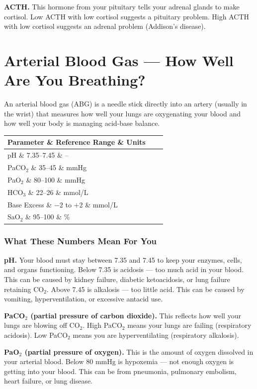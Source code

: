 \textbf{ACTH.} This hormone from your pituitary tells your adrenal glands to make cortisol. Low ACTH with low cortisol suggests a pituitary problem. High ACTH with low cortisol suggests an adrenal problem (Addison's disease).

\clearpage
\section{Arterial Blood Gas --- How Well Are You Breathing?}

An arterial blood gas (ABG) is a needle stick directly into an artery (usually in the wrist) that measures how well your lungs are oxygenating your blood and how well your body is managing acid-base balance.

\begin{longtable}{@{}lll@{}}
\toprule
\textbf{Parameter} \& \textbf{Reference Range} \& \textbf{Units} \\
\midrule
pH \& 7.35--7.45 \& -- \\
PaCO$_2$ \& 35--45 \& mmHg \\
PaO$_2$ \& 80--100 \& mmHg \\
HCO$_3$ \& 22--26 \& mmol/L \\
Base Excess \& $-2$ to $+2$ \& mmol/L \\
SaO$_2$ \& 95--100 \& \% \\
\bottomrule
\end{longtable}

\subsubsection{What These Numbers Mean For You}

\textbf{pH.} Your blood must stay between 7.35 and 7.45 to keep your enzymes, cells, and organs functioning. Below 7.35 is acidosis --- too much acid in your blood. This can be caused by kidney failure, diabetic ketoacidosis, or lung failure retaining CO$_2$. Above 7.45 is alkalosis --- too little acid. This can be caused by vomiting, hyperventilation, or excessive antacid use.

\textbf{PaCO$_2$ (partial pressure of carbon dioxide).} This reflects how well your lungs are blowing off CO$_2$. High PaCO$_2$ means your lungs are failing (respiratory acidosis). Low PaCO$_2$ means you are hyperventilating (respiratory alkalosis).

\textbf{PaO$_2$ (partial pressure of oxygen).} This is the amount of oxygen dissolved in your arterial blood. Below 80 mmHg is hypoxemia --- not enough oxygen is getting into your blood. This can be from pneumonia, pulmonary embolism, heart failure, or lung disease.

